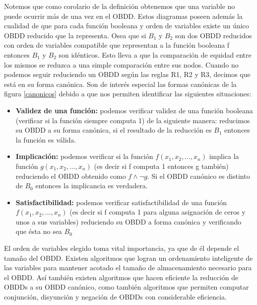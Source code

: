 \documentclass[titlepage, 12pt]{book}
\begin{document}
Notemos que como corolario de la definici\'on obtenemos que una variable no puede ocurrir m\'as de una vez en el OBDD. Estos diagramas poseen adem\'as la cualidad de que para cada funci\'on booleana y orden de variables existe un \'unico OBDD reducido que la representa. Osea que si $B_1$ y $B_2$ son dos OBDD reducidos con orden de variables compatible que representan a la funci\'on booleana f entonces $B_1$ y $B_2$ son id\'enticos. Esto lleva a que la comparaci\'on de equidad entre los mismos se reduzca a una simple comparaci\'on entre sus nodos.
Cuando no podemos seguir reduciendo un OBDD seg\'un las reglas R1, R2 y R3, decimos que est\'a en su forma can\'onica. Son de inter\'es especial las formas can\'onicas de la figura \ref{canonicos} debido a que nos permiten identificar las siguientes situaciones:
\begin{itemize}
\item \textbf{Validez de una funci\'on:} podemos verificar validez de una funci\'on booleana (verificar si la funci\'on siempre computa 1) de la siguiente manera: reducimos su OBDD a su forma can\'onica, si el resultado de la reducci\'on es $B_1$ entonces la funci\'on es v\'alida.
\item \textbf{Implicaci\'on:} podemos verificar si la funci\'on $f(x_1,x_2,...,x_n)$ implica la funci\'on $g(x_1,x_2,...,x_n)$ (es decir si f computa 1 entonces g tambi\'en) reduciendo el OBDD obtenido como $f \wedge \neg g$. Si el OBDD can\'onico es distinto de $B_0$ entonces la implicancia es verdadera.
\item \textbf{Satisfactibilidad:} podemos verificar satisfactibilidad de una funci\'on $f(x_1,x_2,...,x_n)$ (es decir si f computa 1 para alguna asignaci\'on de ceros y unos a sus variables) reduciendo su OBDD a forma can\'onica y verificando que \'esta no sea $B_0$
\end{itemize}

El orden de variables elegido toma vital importancia, ya que de \'el depende el tama\~no del OBDD. Existen algoritmos que logran un ordenamiento inteligente de las variables para mantener acotado el tama\~no de almacenamiento necesario para el OBDD. As\'i tambi\'en existen algoritmos que hacen eficiente la reducci\'on de OBDDs a su OBDD can\'onico, como tambi\'en algoritmos que permiten computar conjunci\'on, disyunci\'on y negaci\'on de OBDDs con considerable eficiencia.\\
\end{document}
